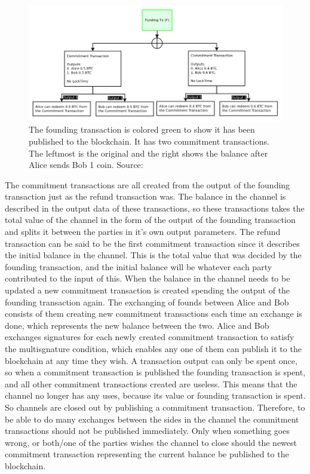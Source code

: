 \documentclass[informationsecurity]{gucmasterproject}
\begin{document}
\begin{figure}[h]
    \centering
    \includegraphics[width=12cm]{figs/ln_commit.png}
    \caption{The founding transaction is colored green to show it has been published to the blockchain. It has two commitment transactions. The leftmost is the original and the right shows the balance after Alice sends Bob 1 coin. Source: \cite{poon2015bitcoin}}
    \label{fig:ln_commit}
\end{figure}

The commitment transactions are all created from the output of the founding transaction just as the refund transaction was. The balance in the channel is described in the output data of these transactions, so these transactions takes the total value of the channel in the form of the output of the founding transaction and splits it between the parties in it's own output parameters. The refund transaction can be said to be the first commitment transaction since it describes the initial balance in the channel. This is the total value that was decided by the founding transaction, and the initial balance will be whatever each party contributed to the input of this. When the balance in the channel needs to be updated a new commitment transaction is created spending the output of the founding transaction again. The exchanging of founds between Alice and Bob consists of them creating new commitment transactions each time an exchange is done, which represents the new balance between the two. Alice and Bob exchanges signatures for each newly created commitment transaction to satisfy the multisgnature condition, which enables any one of them can publish it to the blockchain at any time they wish. A transaction output can only be spent once, so when a commitment transaction is published the founding transaction is spent, and all other commitment transactions created are useless. This means that the channel no longer has any uses, because its value or founding transaction is spent. So channels are closed out by publishing a commitment transaction. Therefore, to be able to do many exchanges between the sides in the channel the commitment transactions should not be published immediately. Only when something goes wrong, or both/one of the parties wishes the channel to close should the newest commitment transaction representing the current balance be published to the blockchain. 
\end{document}
